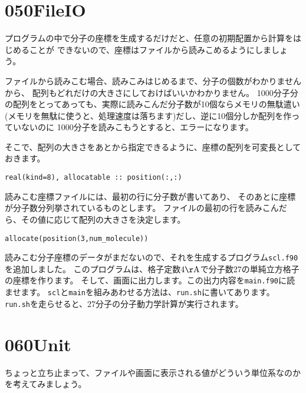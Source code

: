 \documentclass[a4,10pt]{article}
\begin{document}
\section{050FileIO}

プログラムの中で分子の座標を生成するだけだと、任意の初期配置から計算をはじめることが
できないので、座標はファイルから読みこめるようにしましょう。

ファイルから読みこむ場合、読みこみはじめるまで、分子の個数がわかりませんから、
配列もどれだけの大きさにしておけばいいかわかりません。
1000分子分の配列をとってあっても、実際に読みこんだ分子数が10個ならメモリの無駄遣い
(メモリを無駄に使うと、処理速度は落ちます)だし、逆に10個分しか配列を作っていないのに
1000分子を読みこもうとすると、エラーになります。

そこで、配列の大きさをあとから指定できるように、座標の配列を可変長としておきます。
\begin{screen}\begin{verbatim}
real(kind=8), allocatable :: position(:,:)
\end{verbatim}\end{screen}

読みこむ座標ファイルには、最初の行に分子数が書いてあり、
そのあとに座標が分子数分列挙されているものとします。
ファイルの最初の行を読みこんだら、その値に応じて配列の大きさを決定します。
\begin{screen}\begin{verbatim}
allocate(position(3,num_molecule))
\end{verbatim}\end{screen}

読みこむ分子座標のデータがまだないので、それを生成するプログラム{\tt scl.f90}を追加しました。
このプログラムは、格子定数$4 {\rm \AA}$で分子数27の単純立方格子の座標を作ります。
そして、画面に出力します。この出力内容を{\tt main.f90}に読ませます。
{\tt scl}と{\tt main}を組みあわせる方法は、{\tt run.sh}に書いてあります。
{\tt run.sh}を走らせると、27分子の分子動力学計算が実行されます。


\section{060Unit}

ちょっと立ち止まって、ファイルや画面に表示される値がどういう単位系なのかを考えてみましょう。
\end{document}
